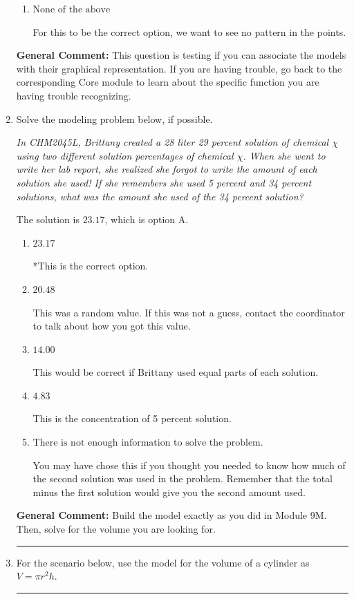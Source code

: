 \documentclass{extbook}[14pt]
\newcommand{\litem}[1]{\item #1

\rule{\textwidth}{0.4pt}}
\begin{document}
\begin{enumerate}
{\begin{enumerate}[label=\Alph*.]
For this to be the correct option, we need to see a mostly straight line of points.
\item \( \text{None of the above} \)

For this to be the correct option, we want to see no pattern in the points.
\end{enumerate}

\textbf{General Comment:} This question is testing if you can associate the models with their graphical representation. If you are having trouble, go back to the corresponding Core module to learn about the specific function you are having trouble recognizing.
}
\litem{
Solve the modeling problem below, if possible.

\begin{center}
    \textit{ In CHM2045L, Brittany created a 28 liter 29 percent solution of chemical $\chi$ using two different solution percentages of chemical $\chi$. When she went to write her lab report, she realized she forgot to write the amount of each solution she used! If she remembers she used 5 percent and 34 percent solutions, what was the amount she used of the 34 percent solution? }
\end{center}


The solution is \( 23.17 \), which is option A.\begin{enumerate}[label=\Alph*.]
\item \( 23.17 \)

*This is the correct option.
\item \( 20.48 \)

This was a random value. If this was not a guess, contact the coordinator to talk about how you got this value.
\item \( 14.00 \)

This would be correct if Brittany used equal parts of each solution.
\item \( 4.83 \)

This is the concentration of 5 percent solution.
\item \( \text{There is not enough information to solve the problem.} \)

You may have chose this if you thought you needed to know how much of the second solution was used in the problem. Remember that the total minus the first solution would give you the second amount used.
\end{enumerate}

\textbf{General Comment:} Build the model exactly as you did in Module 9M. Then, solve for the volume you are looking for.
}
\litem{
For the scenario below, use the model for the volume of a cylinder as $V = \pi r^2 h$.

}
\end{enumerate}
\end{document}
